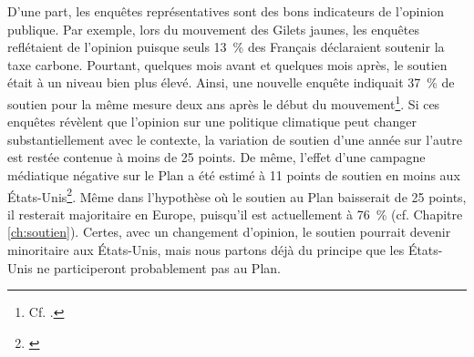 \documentclass[a5paper,french,openany]{memoir}
\begin{document}
D'une part, les enquêtes représentatives sont des bons indicateurs de l'opinion publique. Par exemple, lors du mouvement des Gilets jaunes, les enquêtes reflétaient de l'opinion puisque seuls 13~\% des Français déclaraient soutenir la taxe carbone. Pourtant, quelques mois avant et quelques mois après, le soutien était à un niveau bien plus élevé. Ainsi, une nouvelle enquête indiquait 37~\% de soutien pour la même mesure deux ans après le début du mouvement\footnote{Cf. \cite{douenne_les_2020}.}. Si ces enquêtes révèlent que l'opinion sur une politique climatique peut changer substantiellement avec le contexte, la variation de soutien d'une année sur l'autre est restée contenue à moins de 25 points. De même, l'effet d'une campagne médiatique négative sur le Plan a été estimé à 11 points de soutien en moins 
aux États-Unis\footnote{\cite{fabre_international_2023}}. Même dans l'hypothèse où le soutien au Plan baisserait de 25 points, il resterait majoritaire en Europe, puisqu'il est actuellement à 76~\% (cf. Chapitre \ref{ch:soutien}). Certes, avec un changement d'opinion, le soutien pourrait devenir minoritaire aux États-Unis, mais nous partons déjà du principe que les États-Unis ne participeront probablement pas au Plan. 
\end{document}
